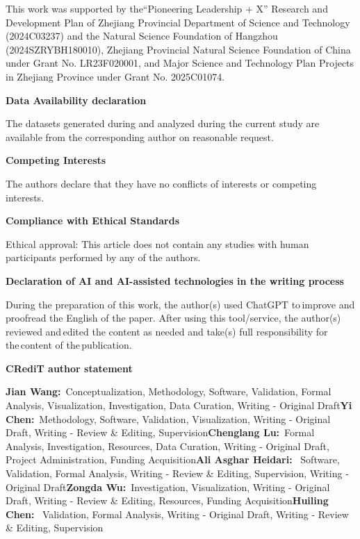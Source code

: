 \documentclass{article} %
\begin{document}
This work was supported by the``Pioneering Leadership + X'' Research and Development Plan of Zhejiang Provincial Department of Science and Technology (2024C03237) and the Natural Science Foundation of Hangzhou (2024SZRYBH180010), Zhejiang Provincial Natural Science Foundation of China under Grant No. LR23F020001, and Major Science and Technology Plan Projects in Zhejiang Province under Grant No. 2025C01074.

\noindent \textbf{Data Availability declaration}

\noindent The datasets generated during and analyzed during the current study are available from the corresponding author on reasonable request.

\noindent \textbf{Competing Interests}

\noindent The authors declare that they have no conflicts of interests or competing interests.\textbf{}

\noindent \textbf{Compliance with Ethical Standards}

\noindent Ethical approval: This article does not contain any studies with human participants performed by any of the authors.

\noindent 

\noindent \textbf{Declaration of AI and AI-assisted technologies in the writing process}

\noindent During the preparation of this work, the author(s) used ChatGPT to improve and proofread the English of the paper. After using this tool/service, the author(s) reviewed and edited the content as needed and take(s) full responsibility for the content of the publication.

\noindent 

\noindent \textbf{CRediT author statement}

\noindent \textbf{Jian Wang:}~Conceptualization, Methodology, Software, Validation, Formal Analysis, Visualization, Investigation, Data Curation, Writing - Original Draft\textbf{Yi Chen:}~Methodology, Software, Validation, Visualization, Writing - Original Draft, Writing - Review \& Editing, Supervision\textbf{Chenglang Lu:}~Formal Analysis, Investigation, Resources, Data Curation, Writing - Original Draft, Project Administration, Funding Acquisition\textbf{Ali Asghar Heidari:}~ Software, Validation, Formal Analysis, Writing - Review \& Editing, Supervision, Writing - Original Draft\textbf{Zongda Wu:}~Investigation, Visualization, Writing - Original Draft, Writing - Review \& Editing, Resources, Funding Acquisition\textbf{Huiling Chen:}~ Validation, Formal Analysis, Writing - Original Draft, Writing - Review \& Editing, Supervision
\end{document}
